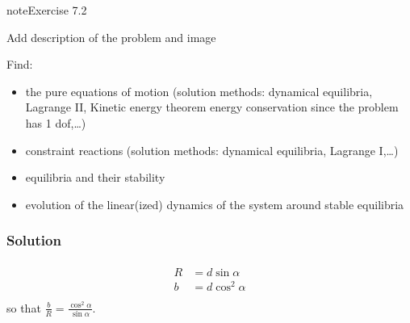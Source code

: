 \documentclass[letterpaper,10pt,english]{jupyterBook}
\begin{document}
\begin{sphinxadmonition}{note}{Exercise 7.2}



\sphinxAtStartPar
{} Add description of the problem and image

\sphinxAtStartPar
Find:
\begin{itemize}
\item {} 
\sphinxAtStartPar
the pure equations of motion (solution methods: dynamical equilibria, Lagrange II, Kinetic energy theorem \sphinxhyphen{} energy conservation \sphinxhyphen{} since the problem has 1 dof,…) 

\item {} 
\sphinxAtStartPar
constraint reactions (solution methods: dynamical equilibria, Lagrange I,…) 

\item {} 
\sphinxAtStartPar
equilibria and their stability 

\item {} 
\sphinxAtStartPar
evolution of the linear(ized) dynamics of the system around stable equilibria 

\end{itemize}
\end{sphinxadmonition}
\subsubsection*{Solution}

\sphinxAtStartPar
{}
\begin{equation*}
\begin{split}\begin{aligned}
  R & = d \sin \alpha \\
  b & = d \cos^2 \alpha \\
\end{aligned}\end{split}
\end{equation*}
\sphinxAtStartPar
so that \(\frac{b}{R} = \frac{\cos^2 \alpha}{\sin \alpha}\).

\sphinxAtStartPar
{}
\end{document}
